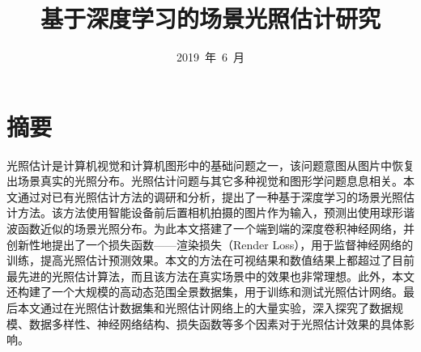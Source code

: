 \confidential{}%
\title{基于深度学习的场景光照估计研究}%
\author{}%
\advisor{}%
\date{2019~年~6~月}%
\AUTHOR{}%
\ADVISOR{}%
\maketitle%
\MAKETITLE%
\makedeclaration%
\chapter*{摘\quad 要}
\setcounter{page}{1}%
光照估计是计算机视觉和计算机图形中的基础问题之一，该问题意图从图片中恢复出场景真实的光照分布。光照估计问题与其它多种视觉和图形学问题息息相关。本文通过对已有光照估计方法的调研和分析，提出了一种基于深度学习的场景光照估计方法。该方法使用智能设备前后置相机拍摄的图片作为输入，预测出使用球形谐波函数近似的场景光照分布。为此本文搭建了一个端到端的深度卷积神经网络，并创新性地提出了一个损失函数——渲染损失（Render Loss），用于监督神经网络的训练，提高光照估计预测效果。本文的方法在可视结果和数值结果上都超过了目前最先进的光照估计算法，而且该方法在真实场景中的效果也非常理想。此外，本文还构建了一个大规模的高动态范围全景数据集，用于训练和测试光照估计网络。最后本文通过在光照估计数据集和光照估计网络上的大量实验，深入探究了数据规模、数据多样性、神经网络结构、损失函数等多个因素对于光照估计效果的具体影响。

